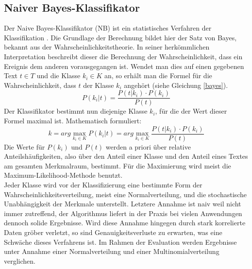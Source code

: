 \subsection{Naiver Bayes-Klassifikator}
Der Naive Bayes-Klassifikator (NB) ist ein statistisches Verfahren der Klassifikation \citep{Rish01}. Die Grundlage der Berechnung bildet hier der Satz von Bayes, bekannt aus der Wahrscheinlichkeitstheorie. In seiner herkömmlichen Interpretation beschreibt dieser die Berechnung der Wahrscheinlichkeit, dass ein Ereignis dem anderen vorausgegangen ist. Wendet man dies auf einen gegebenen Text $t \in T$ und die Klasse $k_i \in K$ an, so erhält man die Formel für die Wahrscheinlichkeit, dass $t$ der Klasse $k_i$ angehört (siehe Gleichung \ref{bayes}).
\begin{equation}
	P(k_i|t) = \frac{P(t|k_i) \cdot P(k_i)}{P(t)}
	\label{bayes}
\end{equation}
Der Klassifikator bestimmt nun diejenige Klasse $k_i$, für die der Wert dieser Formel maximal ist. Mathematisch formuliert:
\begin{equation}
	k = arg \max\limits_{k_i \in K} P(k_i|t) = arg \max\limits_{k_i \in K} \frac{P(t|k_i) \cdot P(k_i)}{P(t)}
\end{equation}
Die Werte für $P(k_i)$ und $P(t)$ werden a priori über relative Anteilshäufigkeiten, also über den Anteil einer Klasse und den Anteil eines Textes am gesamten Merkmalraum, bestimmt. Für die Maximierung wird meist die Maximum-Likelihood-Methode benutzt.\\
Jeder Klasse wird vor der Klassifizierung eine bestimmte Form der Wahrscheinlichkeitsverteilung, meist eine Normalverteilung, und die stochastische Unabhängigkeit der Merkmale unterstellt. Letztere Annahme ist \glqq naiv\grqq{}  weil nicht immer zutreffend, der Algorithmus liefert in der Praxis bei vielen Anwendungen dennoch solide Ergebnisse. Wird diese Annahme hingegen durch stark korrelierte Daten gröber verletzt, so sind Genauigkeitsverluste zu erwarten, was eine Schwäche dieses Verfahrens ist. Im Rahmen der Evaluation werden Ergebnisse unter Annahme einer Normalverteilung und einer Multinomialverteilung verglichen.
\pagebreak
